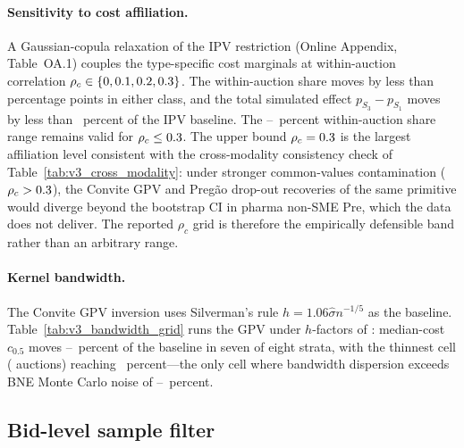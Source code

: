 \paragraph{Sensitivity to cost affiliation.} A Gaussian-copula relaxation of the IPV restriction (Online Appendix, Table~OA.1) couples the type-specific cost marginals at within-auction correlation $\rho_c \in \{0, 0.1, 0.2, 0.3\}$. The within-auction share moves by less than \ipvShareDriftPp{} percentage points in either class, and the total simulated effect $p_{S_3} - p_{S_1}$ moves by less than \ipvTotalDriftPct~percent of the IPV baseline. The \withinShareLow--\withinShareHigh~percent within-auction share range remains valid for $\rho_c \le 0.3$. The upper bound $\rho_c = 0.3$ is the largest affiliation level consistent with the cross-modality consistency check of Table~\ref{tab:v3_cross_modality}: under stronger common-values contamination ($\rho_c > 0.3$), the Convite GPV and Preg\~ao drop-out recoveries of the same primitive would diverge beyond the bootstrap CI in pharma non-SME Pre, which the data does not deliver. The reported $\rho_c$ grid is therefore the empirically defensible band rather than an arbitrary range.

\paragraph{Kernel bandwidth.} The Convite GPV inversion uses Silverman's rule $h = 1.06 \hat\sigma n^{-1/5}$ as the baseline. Table~\ref{tab:v3_bandwidth_grid} runs the GPV under $h$-factors of \bandwidthGrid: median-cost $c_{0.5}$ moves \bandwidthLowPct--\bandwidthHighPct~percent of the baseline in seven of eight strata, with the thinnest cell (\bandwidthThinN{} auctions) reaching \bandwidthThinCellPct~percent---the only cell where bandwidth dispersion exceeds BNE Monte Carlo noise of \monteCarloNoiseLo--\monteCarloNoiseHi~percent.

\subsection{Bid-level sample filter}

